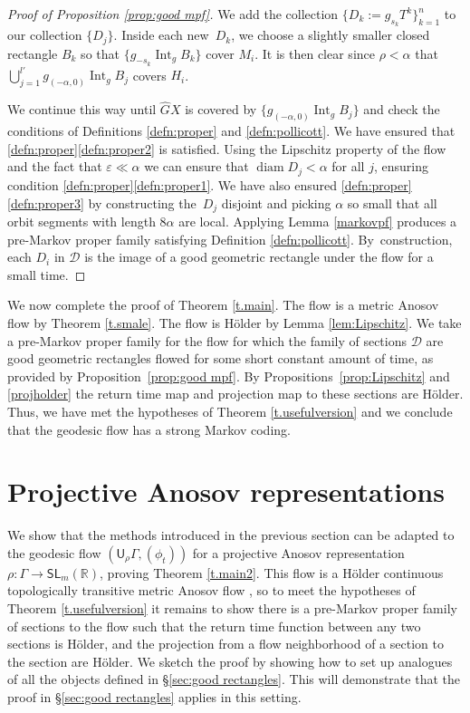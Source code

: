 \documentclass[10pt]{amsart}
\let\mathcal\mathscr
\let\epsilon\varepsilon
\theoremstyle{definition}
\numberwithin{equation}{section}
\DeclareMathOperator{\diam}{diam}
\DeclareMathOperator{\Int}{Int}
\newcommand\DDD{\mathcal D}
\begin{document}
\begin{proof}[Proof of Proposition \ref{prop:good mpf}]
We add the collection $\{ D_k\!:=\!g_{s_k}T^k \}_{k=1}^n$ to our collection $\{D_j\}$. Inside each new~$D_k$, we choose a slightly smaller closed rectangle $B_k$ so that $\{ g_{-s_k} \Int_g B_k \}$ cover $M_i$. It is then clear since $\rho<\alpha$ that $\bigcup_{j=1}^{l'} g_{(-\alpha,0)} \Int_g B_j$ covers $H_i$.

We continue this way until $\hat GX$ is covered by $\{ g_{(-\alpha,0)} \Int_g B_j \}$ and check the conditions of Definitions \ref{defn:proper} and \ref{defn:pollicott}. We have ensured that \ref{defn:proper}\eqref{defn:proper2} is satisfied. Using the Lipschitz property of the flow and the fact that $\epsilon \ll  \alpha$ we can ensure that $\diam D_j < \alpha$ for all $j$, ensuring condition \ref{defn:proper}\eqref{defn:proper1}. We have also ensured \ref{defn:proper}\eqref{defn:proper3} by constructing the~$D_j$ disjoint and picking $\alpha$ so small that all orbit segments with length $8\alpha$ are local. \hbox{Applying} Lemma \ref{markovpf} produces a pre-Markov proper family satisfying Definition \ref{defn:pollicott}. By~construction, each $D_i$ in $\mathcal{D}$ is the image of a good geometric rectangle under the flow for a small time.
\end{proof}

We now complete the proof of Theorem \ref{t.main}. The flow is a metric Anosov flow by Theorem \ref{t.smale}. The flow is Hölder by Lemma \ref{lem:Lipschitz}. We take a pre-Markov proper family for the flow for which the family of sections $\DDD$ are good geometric rectangles flowed for some short constant amount of time, as provided by Proposition~\ref{prop:good mpf}. By Propositions~\ref{prop:Lipschitz} and \ref{projholder} the return time map and projection map to these sections are Hölder. Thus, we have met the hypotheses of Theorem \ref{t.usefulversion} and we conclude that the geodesic flow has a strong Markov coding.

\section{Projective Anosov representations} \label{sec:twoexamples}

We show that the methods introduced in the previous section can be adapted to the geodesic flow $(\mathsf{U}_\rho\Gamma, (\phi_t))$ for a projective Anosov representation $\rho: \Gamma \to \mathsf{SL}_m(\mathbb{R})$, proving Theorem \ref{t.main2}. This flow is a Hölder continuous topologically transitive metric Anosov flow \cite[Prop.\,5.1]{bcls}, so to meet the hypotheses of Theorem \ref{t.usefulversion} it remains to show there is a pre-Markov proper family of sections to the flow such that the return time function between any two sections is Hölder, and the projection from a flow neighborhood of a section to the section are Hölder. We sketch the proof by showing how to set up analogues of all the objects defined in \S \ref{sec:good rectangles}. This will demonstrate that the proof in \S \ref{sec:good rectangles} applies in this setting.
\end{document}
